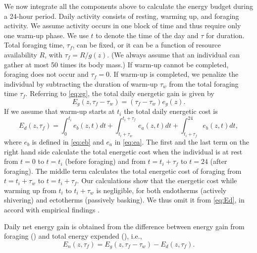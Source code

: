 We now integrate all the components above to calculate the energy budget during a 24-hour period.
Daily activity consists of resting, warming up, and foraging activity.
We assume activity occurs in one block of time and thus require only one warm-up phase. %
We use $t$ to denote the time of the day and $\tau$ for duration.
Total foraging time, $\tau_f$, can be fixed, or it can be a function of resource availability $R$, with $\tau_f = R/g(z)$.
(We always assume that an individual can gather at most 50 times its body mass.)
If warm-up cannot be completed, foraging does not occur and $\tau_f = 0$.
If warm-up is completed, we penalize the individual by subtracting the duration of warm-up $\tau_w$ from the total foraging time $\tau_f$.
Referring to \cref{eq:eg}, the total daily energetic gain is given by
\begin{equation} \label{eq:Eg}
	E_g(z,\tau_f - \tau_w) = (\tau_f - \tau_w) e_g(z).
\end{equation}
If we assume that warm-up starts at $t_i$ the total daily energetic cost is
\begin{equation} \label{eq:Ed}
	E_d(z, \tau_f) = \int_0^{t_i} e_b(z, t) dt + \int_{t_i + \tau_w}^{t_i + \tau_f } e_a(z,t) dt + \int_{t_i+\tau_f}^{24} e_b(z, t) dt,
\end{equation}
where $e_b$ is defined in \cref{eq:eb}  and $e_a$ in \cref{eq:ea}.
The first and the last term on the right hand side calculate the total energetic cost when the individual is at rest from $t = 0$ to $t = t_i$ (before foraging) and from $t = t_i + \tau_f$ to $t = 24$ (after foraging).
The middle term calculates the total energetic cost of foraging from $t = t_i + \tau_w$ to $t = t_i + \tau_f$.
Our calculations show that the energetic cost while warming up from $t_i$ to $t_i + \tau_w$ is negligible, for both endotherms (actively shivering) and ectotherms (passively basking).
We thus omit it from \cref{eq:Ed}, in accord with empirical findings \citep{Heinrich1975}.

Daily net energy gain is obtained from the difference between energy gain from foraging () and total energy expended (), i.e., 
\[
	E_n(z, \tau_f) = E_g(z,\tau_f- \tau_w) - E_d(z, \tau_f).
\]

